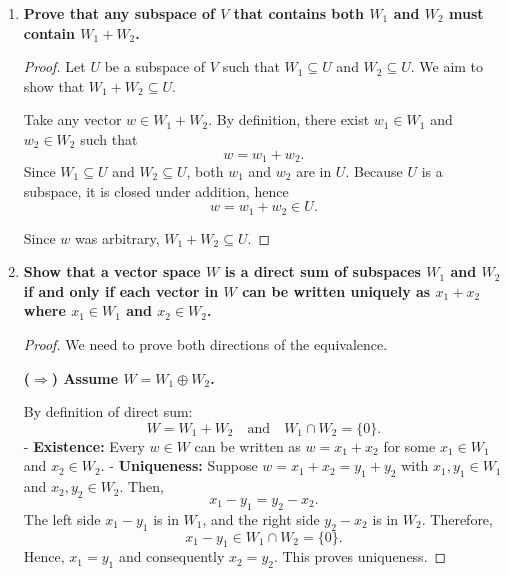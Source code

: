 \documentclass[12pt]{article}
\begin{document}
\begin{enumerate}[label=(\alph*)]
\begin{proof}
        Therefore, \( W_1 + W_2 \) is a subspace of \( V \) containing both \( W_1 \) and \( W_2 \).
    \end{proof}
    
    \item \textbf{Prove that any subspace of \( V \) that contains both \( W_1 \) and \( W_2 \) must contain \( W_1 + W_2 \).}
    
    \begin{proof}
        Let \( U \) be a subspace of \( V \) such that \( W_1 \subseteq U \) and \( W_2 \subseteq U \). We aim to show that \( W_1 + W_2 \subseteq U \).
        
        Take any vector \( w \in W_1 + W_2 \). By definition, there exist \( w_1 \in W_1 \) and \( w_2 \in W_2 \) such that
        \[
        w = w_1 + w_2.
        \]
        Since \( W_1 \subseteq U \) and \( W_2 \subseteq U \), both \( w_1 \) and \( w_2 \) are in \( U \). Because \( U \) is a subspace, it is closed under addition, hence
        \[
        w = w_1 + w_2 \in U.
        \]
        
        Since \( w \) was arbitrary, \( W_1 + W_2 \subseteq U \).
    \end{proof}
    
    \item \textbf{Show that a vector space \( W \) is a direct sum of subspaces \( W_1 \) and \( W_2 \) if and only if each vector in \( W \) can be written uniquely as \( x_1 + x_2 \) where \( x_1 \in W_1 \) and \( x_2 \in W_2 \).}
    
    \begin{proof}
        We need to prove both directions of the equivalence.
        
        \textbf{(\(\Rightarrow\)) Assume \( W = W_1 \oplus W_2 \).}
        
        By definition of direct sum:
        \[
        W = W_1 + W_2 \quad \text{and} \quad W_1 \cap W_2 = \{0\}.
        \]
        - \textbf{Existence:} Every \( w \in W \) can be written as \( w = x_1 + x_2 \) for some \( x_1 \in W_1 \) and \( x_2 \in W_2 \).
        - \textbf{Uniqueness:} Suppose \( w = x_1 + x_2 = y_1 + y_2 \) with \( x_1, y_1 \in W_1 \) and \( x_2, y_2 \in W_2 \). Then,
            \[
            x_1 - y_1 = y_2 - x_2.
            \]
            The left side \( x_1 - y_1 \) is in \( W_1 \), and the right side \( y_2 - x_2 \) is in \( W_2 \). Therefore,
            \[
            x_1 - y_1 \in W_1 \cap W_2 = \{0\}.
            \]
            Hence, \( x_1 = y_1 \) and consequently \( x_2 = y_2 \). This proves uniqueness.
        

\end{proof}
\end{enumerate}
\end{document}
